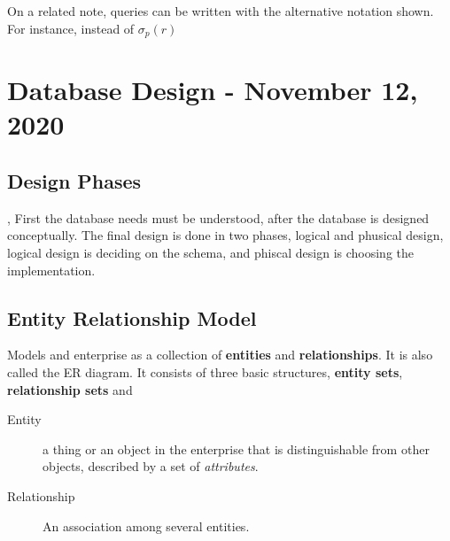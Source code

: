 \documentclass[11pt,a4paper,twocolumn]{book}
\begin{document}
On a related note, queries can be written with the alternative notation shown. For instance,  instead of $\sigma_p (r)$

\chapter{Database Design - November 12, 2020}

\section{Design Phases}

\missing, First the database needs must be understood, after the database is designed conceptually. The final design is done in two phases, logical and phusical design, logical design is deciding on the schema, and phiscal design is choosing the implementation.

\section{Entity Relationship Model}

Models and enterprise as a collection of \textbf{entities} and \textbf{relationships}. It is also called the ER diagram. It consists of three basic structures, \textbf{entity sets}, \textbf{relationship sets} and 

\begin{description}
\item[Entity] a thing or an object in the enterprise that is distinguishable from other objects, described by a set of \textit{attributes}.
\item[Relationship] An association among several entities.
\end{description}
\end{document}

